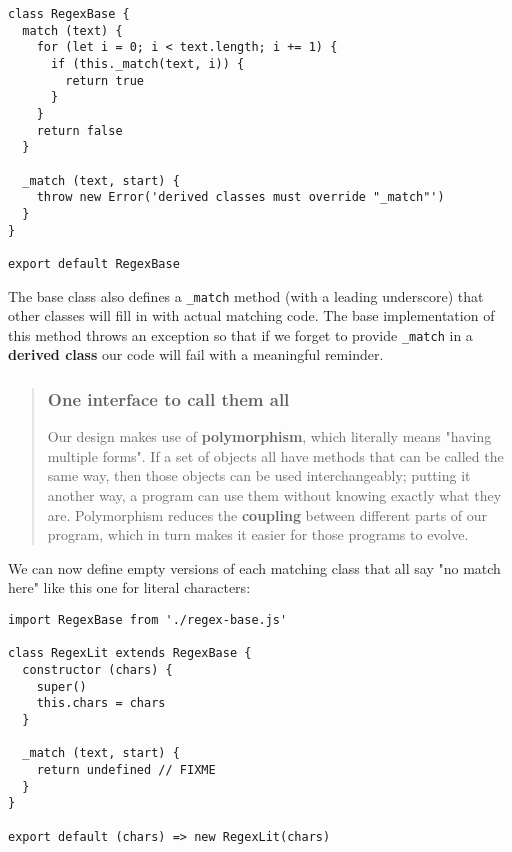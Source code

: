 \documentclass[krantzl]{krantz}
\newcommand{\glossref}[1]{\textbf{#1}}
\newenvironment{callout}{\savenotes\begin{tBox}\begin{quotation}\toggletrue{inbox}\renewcommand{\thempfootnote}{\arabic{footnote}}}{\end{quotation}\vspace{\baselineskip}\end{tBox}\togglefalse{inbox}\spewnotes}
\begin{document}
\begin{lstlisting}[frame=single,frameround=tttt]
class RegexBase {
  match (text) {
    for (let i = 0; i < text.length; i += 1) {
      if (this._match(text, i)) {
        return true
      }
    }
    return false
  }

  _match (text, start) {
    throw new Error('derived classes must override "_match"')
  }
}

export default RegexBase
\end{lstlisting}



\noindent The base class also defines a \texttt{\_match} method (with a leading underscore)
that other classes will fill in with actual matching code.
The base implementation of this method throws an exception
so that if we forget to provide \texttt{\_match} in a \glossref{derived class}
our code will fail with a meaningful reminder.

\begin{callout}


\subsubsection*{One interface to call them all}


Our design makes use of \glossref{polymorphism},
which literally means "having multiple forms".
If a set of objects all have methods that can be called the same way,
then those objects can be used interchangeably;
putting it another way,
a program can use them without knowing exactly what they are.
Polymorphism reduces the \glossref{coupling} between different parts of our program,
which in turn makes it easier for those programs to evolve.

\end{callout}


We can now define empty versions of each matching class that all say "no match here"
like this one for literal characters:


\begin{lstlisting}[frame=single,frameround=tttt]
import RegexBase from './regex-base.js'

class RegexLit extends RegexBase {
  constructor (chars) {
    super()
    this.chars = chars
  }

  _match (text, start) {
    return undefined // FIXME
  }
}

export default (chars) => new RegexLit(chars)
\end{lstlisting}
\end{document}
